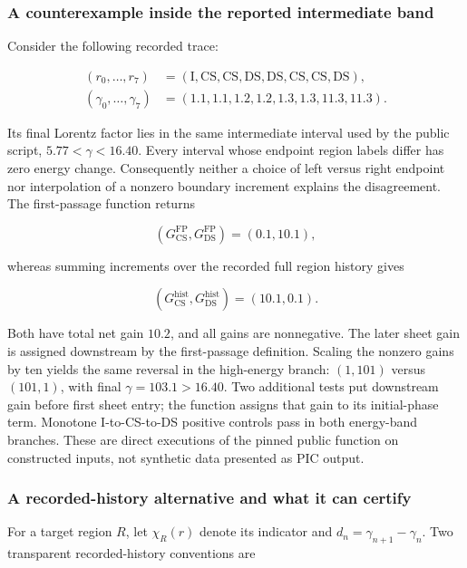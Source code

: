 \subsubsection{A counterexample inside the reported intermediate
band}\label{a-counterexample-inside-the-reported-intermediate-band}

Consider the following recorded trace:

\[
\begin{aligned}
(r_0,\ldots,r_7)&=(\mathrm{I},\mathrm{CS},\mathrm{CS},\mathrm{DS},
 \mathrm{DS},\mathrm{CS},\mathrm{CS},\mathrm{DS}),\\
(\gamma_0,\ldots,\gamma_7)&=(1.1,1.1,1.2,1.2,1.3,1.3,11.3,11.3).
\end{aligned}
\]

Its final Lorentz factor lies in the same intermediate interval used by
the public script, \(5.77<\gamma<16.40\). Every interval whose endpoint
region labels differ has zero energy change. Consequently neither a
choice of left versus right endpoint nor interpolation of a nonzero
boundary increment explains the disagreement. The first-passage function
returns

\[
(G_{\mathrm{CS}}^{\mathrm{FP}},G_{\mathrm{DS}}^{\mathrm{FP}})=(0.1,10.1),
\]

whereas summing increments over the recorded full region history gives

\[
(G_{\mathrm{CS}}^{\mathrm{hist}},G_{\mathrm{DS}}^{\mathrm{hist}})=(10.1,0.1).
\]

Both have total net gain \(10.2\), and all gains are nonnegative. The
later sheet gain is assigned downstream by the first-passage definition.
Scaling the nonzero gains by ten yields the same reversal in the
high-energy branch: \((1,101)\) versus \((101,1)\), with final
\(\gamma=103.1>16.40\). Two additional tests put downstream gain before
first sheet entry; the function assigns that gain to its initial-phase
term. Monotone I-to-CS-to-DS positive controls pass in both energy-band
branches. These are direct executions of the pinned public function on
constructed inputs, not synthetic data presented as PIC output.

\subsubsection{A recorded-history alternative and what it can
certify}\label{a-recorded-history-alternative-and-what-it-can-certify}

For a target region \(R\), let \(\chi_R(r)\) denote its indicator and
\(d_n=\gamma_{n+1}-\gamma_n\). Two transparent recorded-history
conventions are

